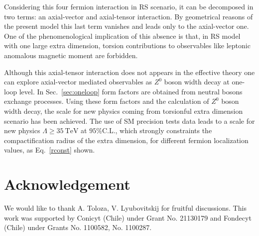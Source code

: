 \documentclass[twocolumn,showpacs,showkeys,prd,superscriptaddress]{revtex4-1}
\begin{document}
Considering this four fermion interaction in RS scenario, it can be decomposed in two terms: an axial-vector and axial-tensor interaction. By geometrical reasons of the present model this last term vanishes and leads only to the axial-vector one. One of the phenomenological implication of this absence is that, in RS model with one large extra dimension, torsion contributions to observables like leptonic anomalous magnetic moment are forbidden. 

Although this axial-tensor interaction does not appears in the effective theory one can explore axial-vector mediated observables as $Z^0$ boson width decay at one-loop level. In Sec.~\ref{sec:oneloop} form factors are obtained from neutral bosons exchange processes. Using these form factors and the calculation of $Z^0$ boson width decay, the scale for new physics coming from torsionful extra dimension scenario has been achieved. The use of SM precision tests data leads to a scale for new physics $ \Lambda \geq \SI{35}{\TeV}$ at $95\%$C.L., which strongly constraints the compactification radius of the extra dimension, for different fermion localization values, as Eq.~\eqref{rconst} shown.




\section*{Acknowledgement}

We would like to thank A. Toloza, V. Lyubovitskij for fruitful discussions. This work was supported by Conicyt (Chile) under Grant No. 21130179 and Fondecyt (Chile) under Grants No. 1100582, No. 1100287.






\end{document}
